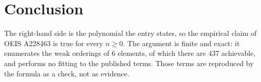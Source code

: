 \documentclass[11pt,a4paper]{article}
\theoremstyle{plain}
\theoremstyle{definition}
\begin{document}
\section{Conclusion}

The right-hand side is the polynomial the entry states, so the empirical claim of OEIS A228463 is
true for every $n\ge 0$. The argument is finite and exact: it enumerates the weak orderings of
$6$ elements, of which there are 437 achievable, and performs no fitting to the
published terms. Those terms are reproduced by the formula as a check, not as evidence.
\end{document}
